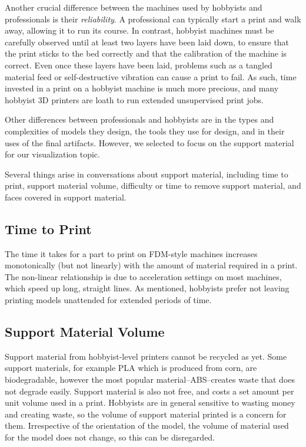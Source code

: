 \documentclass{sigchi}
\begin{document}
Another crucial difference between the machines used by hobbyists and professionals is their \emph{reliability}.  A professional can typically start a print and walk away, allowing it to run its course.  In contrast, hobbyist machines must be carefully observed until at least two layers have been laid down, to ensure that the print sticks to the bed correctly and that the calibration of the machine is correct.  Even once these layers have been laid, problems such as a tangled material feed or self-destructive vibration can cause a print to fail.  As such, time invested in a print on a hobbyist machine is much more precious, and many hobbyist 3D printers are loath to run extended unsupervised print jobs.

Other differences between professionals and hobbyists are in the types and complexities of models they design, the tools they use for design, and in their uses of the final artifacts.  However, we selected to focus on the support material for our visualization topic.

Several things arise in conversations about support material, including time to print, support material volume, difficulty or time to remove support material, and faces covered in support material.

\subsection{Time to Print}
The time it takes for a part to print on FDM-style machines increases monotonically (but not linearly) with the amount of material required in a print.  The non-linear relationship is due to acceleration settings on most machines, which speed up long, straight lines.  As mentioned, hobbyists prefer not leaving printing models unattended for extended periods of time.

\subsection{Support Material Volume}
Support material from hobbyist-level printers cannot be recycled as yet.  Some support materials, for example PLA which is produced from corn, are biodegradable, however the most popular material--ABS--creates waste that does not degrade easily.  Support material is also not free, and costs a set amount per unit volume used in a print.  Hobbyists are in general sensitive to wasting money and creating waste, so the volume of support material printed is a concern for them.  Irrespective of the orientation of the model, the volume of material used for the model does not change, so this can be disregarded.
\end{document}
